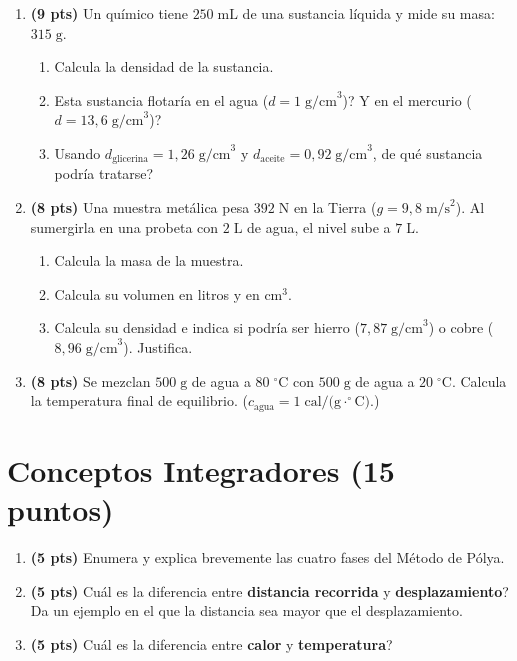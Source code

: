 \documentclass[12pt, letterpaper]{article}
\begin{document}
\begin{enumerate}[leftmargin=*]
  \item \textbf{(9 pts)} Un químico tiene $250\;\text{mL}$ de una sustancia líquida y mide su masa: $315\;\text{g}$.
        \begin{enumerate}[label=\alph*)]
          \item Calcula la densidad de la sustancia.
          \item \textquestiondown Esta sustancia flotaría en el agua ($d = 1\;\text{g/cm}^3$)? \textquestiondown Y en el mercurio ($d = 13{,}6\;\text{g/cm}^3$)?
          \item Usando $d_{\text{glicerina}} = 1{,}26\;\text{g/cm}^3$ y $d_{\text{aceite}} = 0{,}92\;\text{g/cm}^3$, \textquestiondown de qué sustancia podría tratarse?
        \end{enumerate}

  \item \textbf{(8 pts)} Una muestra metálica pesa $392\;\text{N}$ en la Tierra ($g = 9{,}8\;\text{m/s}^2$). Al sumergirla en una probeta con $2\;\text{L}$ de agua, el nivel sube a $7\;\text{L}$.
        \begin{enumerate}[label=\alph*)]
          \item Calcula la masa de la muestra.
          \item Calcula su volumen en litros y en $\text{cm}^3$.
          \item Calcula su densidad e indica si podría ser hierro ($7{,}87\;\text{g/cm}^3$) o cobre ($8{,}96\;\text{g/cm}^3$). Justifica.
        \end{enumerate}

  \item \textbf{(8 pts)} Se mezclan $500\;\text{g}$ de agua a $80\;^\circ\text{C}$ con $500\;\text{g}$ de agua a $20\;^\circ\text{C}$. Calcula la temperatura final de equilibrio. ($c_{\text{agua}} = 1\;\text{cal/(g}\cdot^\circ\text{C)}$.)
\end{enumerate}

\newpage

\section{Conceptos Integradores (15 puntos)}

\begin{enumerate}[leftmargin=*]
  \item \textbf{(5 pts)} Enumera y explica brevemente las cuatro fases del Método de Pólya.

  \item \textbf{(5 pts)} \textquestiondown Cuál es la diferencia entre \textbf{distancia recorrida} y \textbf{desplazamiento}? Da un ejemplo en el que la distancia sea mayor que el desplazamiento.

  \item \textbf{(5 pts)} \textquestiondown Cuál es la diferencia entre \textbf{calor} y \textbf{temperatura}?
\end{enumerate}
\end{document}
